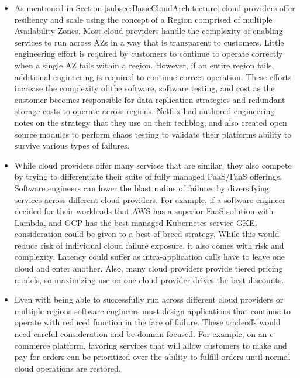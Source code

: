 \documentclass[conference]{IEEEtran}
\begin{document}
\begin{itemize}
	\item As mentioned in Section \ref{subsec:BasicCloudArchitecture} cloud providers offer resiliency and scale using the concept of a Region comprised of multiple Availability Zones.  Most cloud providers handle the complexity of enabling services to run across AZs in a way that is transparent to customers.  Little engineering effort is required by customers to continue to operate correctly when a single AZ fails within a region.  However, if an entire region fails, additional engineering is required to continue correct operation. These efforts increase the complexity of the software, software testing, and cost as the customer becomes responsible for data replication strategies and redundant storage costs to operate across regions. Netflix had authored engineering notes on the strategy that they use on their techblog\cite{NetflixMultiRegion}, and also created open source modules to perform chaos testing to validate their platforms ability to survive various types of failures. 
	
	\item While cloud providers offer many services that are similar, they also compete by trying to differentiate their suite of fully managed PaaS/FaaS offerings.  Software engineers can lower the blast radius of failures by diversifying services across different cloud providers.  For example, if a software engineer decided for their workloads that AWS has a superior FaaS solution with Lambda, and GCP has the best managed Kubernetes service GKE, consideration could be given to a best-of-breed strategy.  While this would reduce risk of individual cloud failure exposure, it also comes with risk and complexity.  Latency could suffer as intra-application calls have to leave one cloud and enter another.  Also, many cloud providers provide tiered pricing models, so maximizing use on one cloud provider drives the best discounts.  
	
	\item Even with being able to successfully run across different cloud providers or multiple regions software engineers must design applications that continue to operate with reduced function in the face of failure.  These tradeoffs would need careful consideration and be domain focused.  For example, on an e-commerce platform, favoring services that will allow customers to make and pay for orders can be prioritized over the ability to fulfill orders until normal cloud operations are restored. 
	

\end{itemize}
\end{document}

